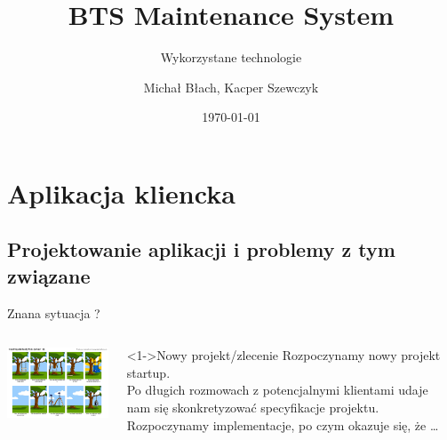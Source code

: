 \documentclass{beamer}
\title{BTS Maintenance System }
\subtitle{Wykorzystane technologie}
\author{Michał Błach, Kacper Szewczyk}
\date{\today}
\begin{document}
\begin{frame}
\titlepage
\end{frame}
\begin{frame}
\tableofcontents
\end{frame}

\section{Aplikacja kliencka}

\subsection{Projektowanie aplikacji i problemy z tym związane}
\begin{frame}{Znana sytuacja ?}
     \begin{columns}[T] %
      \begin{column}[T]{8cm} %
          \includegraphics[width=8cm]{how_works.png}
     \end{column}
     \begin{column}[T]{4cm} %
     \begin{block}<1->{Nowy projekt/zlecenie}
	Rozpoczynamy nowy projekt startup.\\
	Po długich rozmowach z potencjalnymi klientami udaje nam się skonkretyzować specyfikacje projektu.
	Rozpoczynamy implementacje, po czym okazuje się, że \dots 
\end{block}
     \end{column}
     \end{columns}
\end{frame}
\end{document}
